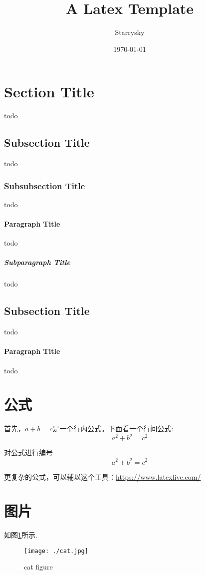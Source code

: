 \documentclass[UTF8]{ctexart}
\title{A Latex Template}
\author{Starrysky}
\date{\today}
\begin{document}
\maketitle
\tableofcontents
\newpage

\section{Section Title}
todo
\subsection{Subsection Title}
todo
\subsubsection{Subsubsection Title}
todo
\paragraph{Paragraph Title}
todo
\subparagraph{Subparagraph Title}
todo
\subsection{Subsection Title}
todo
\paragraph{Paragraph Title}
todo
\section{公式}
首先，$a+b=c$是一个行内公式。下面看一个行间公式:
\[
    a^2+b^2=c^2
\]


对公式进行编号
\begin{equation}
    a^2+b^2=c^2
\end{equation}


更复杂的公式，可以辅以这个工具：\href{https://www.latexlive.com/}{https://www.latexlive.com/}


\section{图片}
如图\ref{fig:1}所示.
\begin{figure}[H]
    \centering
    \texttt{[image: ./cat.jpg]}
    \caption{cat figure}
    \label{fig:1}
\end{figure}
\end{document}
